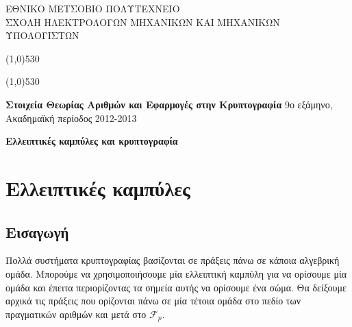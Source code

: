 \documentclass[12pt]{article}
\begin{document}
\begin{titlepage}
\begin{center}

ΕΘΝΙΚΟ ΜΕΤΣΟΒΙΟ ΠΟΛΥΤΕΧΝΕΙΟ \\
ΣΧΟΛΗ ΗΛΕΚΤΡΟΛΟΓΩΝ ΜΗΧΑΝΙΚΩΝ KΑΙ ΜΗΧΑΝΙΚΩΝ ΥΠΟΛΟΓΙΣΤΩΝ \\ 
\vspace{0.5em}

\medskip 

\def\doubleline{

    \vspace{0.1em}
    \line(1,0){530}\

    \vspace{-1.5em}
    \line(1,0){530}

}
\doubleline
\vspace{1.3em}

{\large \textbf{Στοιχεία Θεωρίας Αριθμών και Εφαρμογές στην Κρυπτογραφία}
 \medskip
9ο εξάμηνο, Ακαδημαϊκή περίοδος 2012-2013 \\ \bigskip \medskip}

\vspace{1.5em}
{\LARGE \textbf{Ελλειπτικές καμπύλες και κρυπτογραφία\\}}
\vspace{16em}


\end{center}
\end{titlepage}

\pagebreak

\tableofcontents

\pagebreak

\section{Ελλειπτικές καμπύλες}

\subsection{Εισαγωγή}
Πολλά συστήματα κρυπτογραφίας βασίζονται σε  πράξεις πάνω σε κάποια αλγεβρική ομάδα. Μπορούμε να χρησιμοποιήσουμε μία ελλειπτική καμπύλη για να ορίσουμε μία ομάδα και έπειτα περιορίζοντας τα σημεία αυτής να ορίσουμε ένα σώμα. Θα δείξουμε αρχικά τις πράξεις που ορίζονται πάνω σε μία τέτοια ομάδα στο πεδίο των πραγματικών αριθμών και μετά στο $\mathcal{F}_p$.
\end{document}
